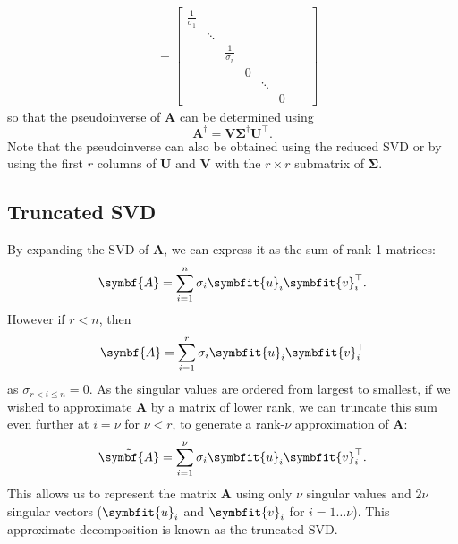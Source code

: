 \documentclass{article}
\begin{document}
\begin{multicols*}{3}
\begin{align*}
                               & = \begin{bmatrix}
                                       \frac{1}{\sigma_1} &        &                    &   &        &   &  & \\
                                                          & \ddots &                    &   &        &   &  & \\
                                                          &        & \frac{1}{\sigma_r} &   &        &   &  & \\
                                                          &        &                    & 0 &        &   &  & \\
                                                          &        &                    &   & \ddots &   &  & \\
                                                          &        &                    &   &        & 0 &  &
                                   \end{bmatrix}
    \end{align*}
    so that the pseudoinverse of \(\symbf{A}\) can be determined using
    \begin{equation*}
        \symbf{A}^\dagger = \symbf{V} \symbf{\Sigma}^\dagger \symbf{U}^\top.
    \end{equation*}
    Note that the pseudoinverse can also be obtained using the reduced SVD or by using the first \(r\) columns of \(\symbf{U}\) and \(\symbf{V}\) with the \(r \times r\) submatrix of \(\symbf{\Sigma}\).
    \subsection{Truncated SVD}
    By expanding the SVD of \(\symbf{A}\), we can express it as the sum of rank-1 matrices:
    \begin{equation*}
        \symbf{A} = \sum_{i = 1}^n \sigma_i \symbfit{u}_i \symbfit{v}^\top_i.
    \end{equation*}
    However if \(r < n\), then
    \begin{equation*}
        \symbf{A} = \sum_{i = 1}^r \sigma_i \symbfit{u}_i \symbfit{v}^\top_i
    \end{equation*}
    as \(\sigma_{r < i \leq n} = 0\). As the singular values are ordered from largest to smallest, if we wished to approximate \(\symbf{A}\)
    by a matrix of lower rank, we can truncate this sum even further at \(i = \nu\) for \(\nu < r\), to generate a rank-\(\nu\) approximation of \(\symbf{A}\):
    \begin{equation*}
        \tilde{\symbf{A}} = \sum_{i = 1}^\nu \sigma_i \symbfit{u}_i \symbfit{v}^\top_i.
    \end{equation*}
    This allows us to represent the matrix \(\symbf{A}\) using only \(\nu\) singular values and \(2\nu\) singular vectors
    (\(\symbfit{u}_i\) and \(\symbfit{v}_i\) for \(i = 1 \ldots \nu\)). This approximate decomposition is known as the truncated SVD\@.

\end{multicols*}
\end{document}
